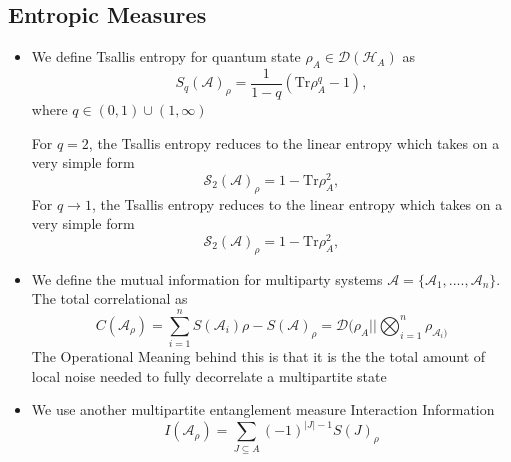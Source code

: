 \subsection{Entropic Measures}
\begin{itemize}
    \item We define Tsallis entropy for quantum state $\rho_A \in \mathcal{D}(\mathcal{H}_A)$ as 
\begin{equation}
    S_q(\mathcal{A})_\rho = \frac{1}{1-q}(\text{Tr}\rho_A^q- 1),
 \end{equation}
 where $q \in (0, 1) \cup (1, \infty)$

 For $q=2$, the Tsallis entropy reduces to the linear entropy which takes on a very simple form
\begin{equation}
    \mathcal{S}_2(\mathcal{A})_\rho = 1 - \text{Tr} \rho_A^2,
\end{equation}
 For $ q \rightarrow 1$, the Tsallis entropy reduces to the linear entropy which takes on a very simple form
\begin{equation}
    \mathcal{S}_2(\mathcal{A})_\rho = 1 - \text{Tr} \rho_A^2,
    \end{equation}
\item We define the mutual information for multiparty systems $\mathcal{A} = \{ \mathcal{A}_1, ...., \mathcal{A}_n \}$. The total correlational as 
\begin{equation}
    C(\mathcal{A}_\rho) = \sum^n_{i=1} S(\mathcal{A}_i)\rho - S(\mathcal{A})_\rho = \mathcal{D}(\rho_A \vert \vert \bigotimes^n_{i=1}\rho_{\mathcal{A}_i)}
\end{equation}
The Operational Meaning behind this is that it is the the total amount of local noise needed to fully decorrelate a multipartite state 
\item We use another multipartite entanglement measure Interaction Information
\begin{equation}
    I(\mathcal{A}_\rho) = \sum_{J \subseteq A} (-1)^{|J| - 1} S(J)_\rho
\end{equation}
\end{itemize}

